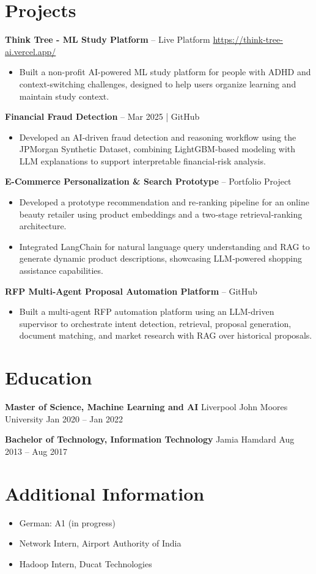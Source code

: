 \documentclass[10pt,a4paper]{article}
\begin{document}
\section{Projects}
\textbf{Think Tree - ML Study Platform} -- Live Platform \textbar{} \href{https://think-tree-ai.vercel.app/}{https://think-tree-ai.vercel.app/}\par
\begin{itemize}
  \item Built a non-profit AI-powered ML study platform for people with ADHD and context-switching challenges, designed to help users organize learning and maintain study context.
\end{itemize}
\textbf{Financial Fraud Detection} -- Mar 2025 | GitHub\par
\begin{itemize}
  \item Developed an AI-driven fraud detection and reasoning workflow using the JPMorgan Synthetic Dataset, combining LightGBM-based modeling with LLM explanations to support interpretable financial-risk analysis.
\end{itemize}
\textbf{E-Commerce Personalization \& Search Prototype} -- Portfolio Project\par
\begin{itemize}
  \item Developed a prototype recommendation and re‑ranking pipeline for an online beauty retailer using product embeddings and a two‑stage retrieval‑ranking architecture.
  \item Integrated LangChain for natural language query understanding and RAG to generate dynamic product descriptions, showcasing LLM‑powered shopping assistance capabilities.
\end{itemize}
\textbf{RFP Multi-Agent Proposal Automation Platform} -- GitHub\par
\begin{itemize}
  \item Built a multi-agent RFP automation platform using an LLM-driven supervisor to orchestrate intent detection, retrieval, proposal generation, document matching, and market research with RAG over historical proposals.
\end{itemize}

\section{Education}
\textbf{Master of Science, Machine Learning and AI} \textbar{} Liverpool John Moores University \hfill Jan 2020 -- Jan 2022\par
\textbf{Bachelor of Technology, Information Technology} \textbar{} Jamia Hamdard \hfill Aug 2013 -- Aug 2017\par

\section{Additional Information}
\begin{itemize}
  \item German: A1 (in progress)
  \item Network Intern, Airport Authority of India
  \item Hadoop Intern, Ducat Technologies
\end{itemize}
\end{document}
